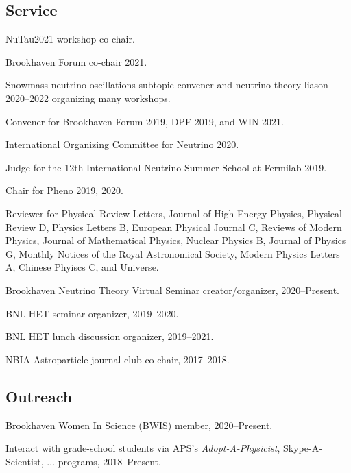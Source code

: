 \documentclass{article}
\renewenvironment{itemize}{
\begin{list}{}{
\setlength{\leftmargin}{.5em}}}{
\end{list}}
\begin{document}
\subsection*{Service}
\begin{itemize}
\item NuTau2021 workshop co-chair.
\item Brookhaven Forum co-chair 2021.
\item Snowmass neutrino oscillations subtopic convener and neutrino theory liason 2020--2022 organizing many workshops.
\item Convener for Brookhaven Forum 2019, DPF 2019, and WIN 2021.
\item International Organizing Committee for Neutrino 2020.
\item Judge for the 12th International Neutrino Summer School at Fermilab 2019. 
\item Chair for Pheno 2019, 2020.
\item Reviewer for Physical Review Letters, Journal of High Energy Physics, Physical Review D, Physics Letters B, European Physical Journal C, Reviews of Modern Physics, Journal of Mathematical Physics, Nuclear Physics B, Journal of Physics G, Monthly Notices of the Royal Astronomical Society, Modern Physics Letters A, Chinese Phyiscs C, and Universe.
\item Brookhaven Neutrino Theory Virtual Seminar creator/organizer, 2020--Present.
\item BNL HET seminar organizer, 2019--2020.
\item BNL HET lunch discussion organizer, 2019--2021.
\item NBIA Astroparticle journal club co-chair, 2017--2018.
\end{itemize}

\subsection*{Outreach}
\begin{itemize}
\item Brookhaven Women In Science (BWIS) member, 2020--Present.
\item Interact with grade-school students via APS's \emph{Adopt-A-Physicist}, Skype-A-Scientist, $\dots$ programs, 2018--Present.
\end{itemize}
\end{document}
